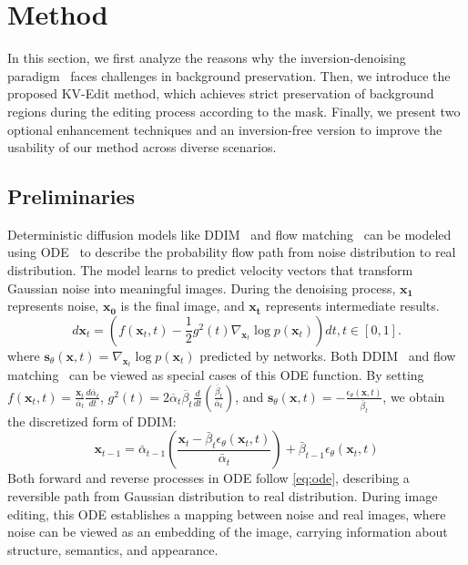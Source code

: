 \section{Method}
\label{sec:method}
In this section, we first analyze the reasons why the inversion-denoising paradigm~\cite{dong2023prompt,hertz2022prompt} faces challenges in background preservation. Then, we introduce the proposed KV-Edit method, which achieves strict preservation of background regions during the editing process according to the mask. Finally, we present two optional enhancement techniques and an inversion-free version to improve the usability of our method across diverse scenarios.

\subsection{Preliminaries}

Deterministic diffusion models like DDIM~\cite{ddim} and flow matching~\cite{lipman2022flow} can be modeled using ODE~\cite{song2020score} to describe the probability flow path from noise distribution to real distribution. The model learns to predict velocity vectors that transform Gaussian noise into meaningful images. During the denoising process, $\mathbf{x_1}$ represents noise, $\mathbf{x_0}$ is the final image, and $\mathbf{x_t}$ represents intermediate results.
\begin{equation}
d\mathbf{x}_t=\left(f(\mathbf{x}_t,t)-\frac{1}{2}g^2(t)\nabla_{\mathbf{x}_t}\log p(\mathbf{x}_t)\right)dt,t \in[0,1].
\label{eq:ode}
\end{equation}
where $\mathbf{s}_\theta(\mathbf{x},t)=\nabla_{\mathbf{x}_t}\log p(\mathbf{x}_t)$ predicted by networks. Both DDIM~\cite{ddim} and flow matching~\cite{lipman2022flow} can be viewed as special cases of this ODE function. By setting 
$f(\mathbf{x}_t,t)=\frac{\mathbf{x}_t}{\overline{\alpha}_t}\frac{d\overline{\alpha}_t}{dt}$, 
$g^2(t)=2\overline{\alpha}_t\overline{\beta}_t\frac{d}{dt}\left(\frac{\overline{\beta}_t}{\overline{\alpha}_t}\right)$, and 
$\mathbf{s}_\theta(\mathbf{x},t)=-\frac{\epsilon_\theta(\mathbf{x},t)}{\overline{\beta}_t}$, we obtain the discretized form of DDIM:
\begin{equation}
\mathbf{x}_{t-1}=\bar{\alpha}_{t-1}\left(\frac{\mathbf{x}_t-\bar{\beta}_t\epsilon_\theta(\mathbf{x}_t,t)}{\bar{\alpha}_t}\right)
+\bar{\beta}_{t-1}\epsilon_\theta(\mathbf{x}_t,t)
\end{equation}
Both forward and reverse processes in ODE follow \cref{eq:ode}, describing a reversible path from Gaussian distribution to real distribution. During image editing, this ODE establishes a mapping between noise and real images, where noise can be viewed as an embedding of the image, carrying information about structure, semantics, and appearance.

